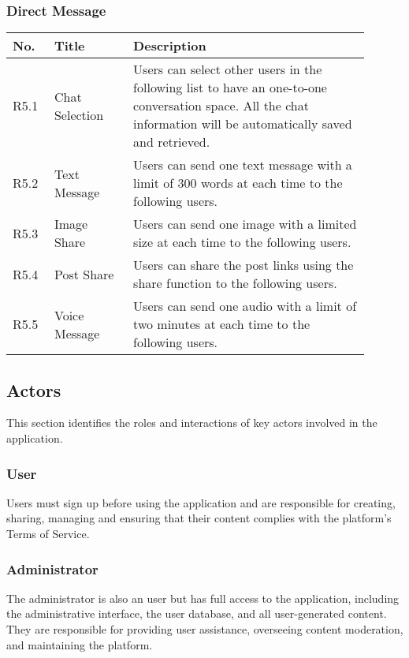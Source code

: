 \documentclass[11pt, a4paper]{article}
\begin{document}
\smallskip

\subsubsection{Direct Message}
\begin{tabular}{|>{\centering\arraybackslash}m{0.1\linewidth}|>{\centering\arraybackslash}m{0.2\linewidth}|>{\raggedright\arraybackslash}m{0.6\linewidth}|} \hline
     No.&  Title&Description\\ \hline 
     R5.1&   Chat Selection&Users can select other users in the following list to have an one-to-one conversation space. All the chat information will be automatically saved and retrieved.\\ \hline 
     R5.2&   Text Message&Users can send one text message with a limit of 300 words at each time to the following users.\\ \hline 
     R5.3&   Image Share&Users can send one image with a limited size at each time to the following users.\\ \hline 
     R5.4&   Post Share&Users can share the post links using the share function to the following users.\\\hline
 R5.5& Voice Message&Users can send one audio with a limit of two minutes at each time to the following users.\\\hline
\end{tabular}

\bigskip

\subsection{Actors}
This section identifies the roles and interactions of key actors involved in the application.
\subsubsection{User}
Users must sign up before using the application and are responsible for creating, sharing, managing and ensuring that their content complies with the platform's Terms of Service.
\subsubsection{Administrator}
The administrator is also an user but has full access to the application, including the administrative interface, the user database, and all user-generated content. They are responsible for providing user assistance, overseeing content moderation, and maintaining the platform.
\end{document}
